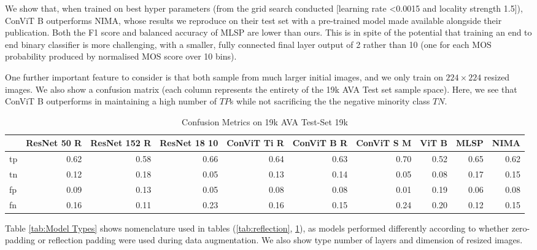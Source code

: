 We show that, when trained on best hyper parameters (from the grid search conducted [learning rate <0.0015 and locality strength 1.5]), ConViT B outperforms NIMA\cite{Talebi2018}, whose results we reproduce on their test set with a pre-trained model made available alongside their publication. Both the F1 score and balanced accuracy of MLSP\cite{Hosu2019} are lower than ours. This is in spite of the potential that training an end to end binary classifier is more challenging, with a smaller, fully connected final layer output of 2 rather than 10 (one for each MOS probability produced by normalised MOS score over 10 bins). 


One further important feature to consider is that \cite{Talebi2018, Hosu2019} both sample from much larger initial images, and we only train on $224 \times 224$ resized images. We also show a confusion matrix (each column represents the entirety of the 19k AVA Test set sample space). Here, we see that ConViT B outperforms in maintaining a high number of $TP$s while not sacrificing the the negative minority class $TN$.

\begin{table}[ht]
\tiny
    \centering
   \begin{tabular}{lrrrrrrrrr}
\toprule
{} &  ResNet 50 R &  ResNet 152 R &  ResNet 18 10 &  ConViT Ti R &  ConViT B R &  ConViT S M &  ViT B &  MLSP &  NIMA \\
\midrule
tp &         0.62 &          0.58 &          0.66 &         0.64 &        0.63 &        0.70 &   0.52 &  0.65 &  0.62 \\
tn &         0.12 &          0.18 &          0.05 &         0.13 &        0.14 &        0.05 &   0.08 &  0.17 &  0.15 \\
fp &         0.09 &          0.13 &          0.05 &         0.08 &        0.08 &        0.01 &   0.19 &  0.06 &  0.08 \\
fn &         0.16 &          0.11 &          0.23 &         0.16 &        0.15 &        0.24 &   0.20 &  0.12 &  0.15 \\
\bottomrule
\end{tabular}

    \caption{Confusion Metrics on 19k AVA Test-Set 19k }
    \label{tab:Cofusion Metrics}
\end{table}


Table \ref{tab:Model Types} shows nomenclature used in tables (\ref{tab:reflection}, \ref{tab:Cofusion Metrics}), as models performed differently according to whether zero-padding or reflection padding were used during data augmentation. We also show type number of layers and dimension of resized images. 

